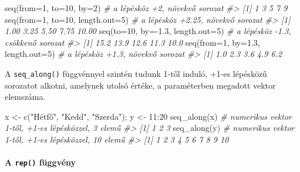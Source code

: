 \documentclass[
]{book}
\newenvironment{Shaded}{\begin{snugshade}}{\end{snugshade}}
\newcommand{\AttributeTok}[1]{\textcolor[rgb]{0.77,0.63,0.00}{#1}}
\newcommand{\CommentTok}[1]{\textcolor[rgb]{0.56,0.35,0.01}{\textit{#1}}}
\newcommand{\DecValTok}[1]{\textcolor[rgb]{0.00,0.00,0.81}{#1}}
\newcommand{\FloatTok}[1]{\textcolor[rgb]{0.00,0.00,0.81}{#1}}
\newcommand{\FunctionTok}[1]{\textcolor[rgb]{0.00,0.00,0.00}{#1}}
\newcommand{\NormalTok}[1]{#1}
\newcommand{\OtherTok}[1]{\textcolor[rgb]{0.56,0.35,0.01}{#1}}
\newcommand{\SpecialCharTok}[1]{\textcolor[rgb]{0.00,0.00,0.00}{#1}}
\newcommand{\StringTok}[1]{\textcolor[rgb]{0.31,0.60,0.02}{#1}}
\begin{document}
\begin{Shaded}
\begin{Highlighting}[]
\FunctionTok{seq}\NormalTok{(}\AttributeTok{from=}\DecValTok{1}\NormalTok{, }\AttributeTok{to=}\DecValTok{10}\NormalTok{, }\AttributeTok{by=}\DecValTok{2}\NormalTok{)           }\CommentTok{\# a lépésköz +2, növekvő sorozat}
\CommentTok{\#\textgreater{} [1] 1 3 5 7 9}
\FunctionTok{seq}\NormalTok{(}\AttributeTok{from=}\DecValTok{1}\NormalTok{, }\AttributeTok{to=}\DecValTok{10}\NormalTok{, }\AttributeTok{length.out=}\DecValTok{5}\NormalTok{)   }\CommentTok{\# a lépésköz +2.25, növekvő sorozat}
\CommentTok{\#\textgreater{} [1]  1.00  3.25  5.50  7.75 10.00}
\FunctionTok{seq}\NormalTok{(}\AttributeTok{to=}\DecValTok{10}\NormalTok{, }\AttributeTok{by=}\SpecialCharTok{{-}}\FloatTok{1.3}\NormalTok{, }\AttributeTok{length.out=}\DecValTok{5}\NormalTok{)  }\CommentTok{\# a lépésköz {-}1.3, csökkenő sorozat}
\CommentTok{\#\textgreater{} [1] 15.2 13.9 12.6 11.3 10.0}
\FunctionTok{seq}\NormalTok{(}\AttributeTok{from=}\DecValTok{1}\NormalTok{, }\AttributeTok{by=}\FloatTok{1.3}\NormalTok{, }\AttributeTok{length.out=}\DecValTok{5}\NormalTok{)  }\CommentTok{\# a lépésköz +1.3, növekvő sorozat}
\CommentTok{\#\textgreater{} [1] 1.0 2.3 3.6 4.9 6.2}
\end{Highlighting}
\end{Shaded}

A \texttt{seq\_along()} függvénnyel szintén tudunk 1-től induló, +1-es lépésközű sorozatot alkotni, amelynek utolsó értéke, a paraméterben megadott vektor elemszáma.

\begin{Shaded}
\begin{Highlighting}[]
\NormalTok{x }\OtherTok{\textless{}{-}} \FunctionTok{c}\NormalTok{(}\StringTok{"Hétfő"}\NormalTok{, }\StringTok{"Kedd"}\NormalTok{, }\StringTok{"Szerda"}\NormalTok{); y }\OtherTok{\textless{}{-}} \DecValTok{11}\SpecialCharTok{:}\DecValTok{20}
\FunctionTok{seq\_along}\NormalTok{(x) }\CommentTok{\# numerikus vektor 1{-}től, +1{-}es lépésközzel, 3 elemű}
\CommentTok{\#\textgreater{} [1] 1 2 3}
\FunctionTok{seq\_along}\NormalTok{(y) }\CommentTok{\# numerikus vektor 1{-}től, +1{-}es lépésközzel, 10 elemű}
\CommentTok{\#\textgreater{}  [1]  1  2  3  4  5  6  7  8  9 10}
\end{Highlighting}
\end{Shaded}

\hypertarget{a-rep-fuxfcggvuxe9ny}{%
\paragraph{\texorpdfstring{A \texttt{rep()} függvény}{A rep() függvény}}\label{a-rep-fuxfcggvuxe9ny}}
\end{document}
